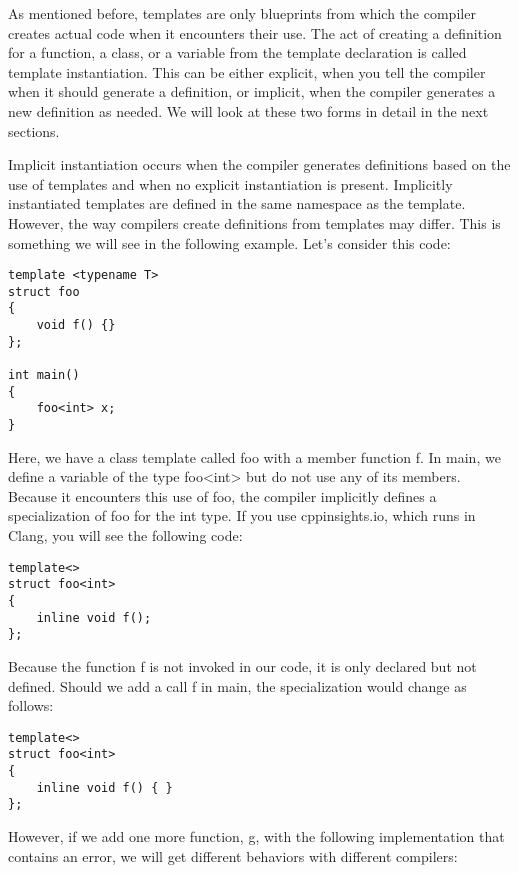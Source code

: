 
As mentioned before, templates are only blueprints from which the compiler creates actual code when it encounters their use. The act of creating a definition for a function, a class, or a variable from the template declaration is called template instantiation. This can be either explicit, when you tell the compiler when it should generate a definition, or implicit, when the compiler generates a new definition as needed. We will look at these two forms in detail in the next sections.


Implicit instantiation occurs when the compiler generates definitions based on the use of templates and when no explicit instantiation is present. Implicitly instantiated templates are defined in the same namespace as the template. However, the way compilers create definitions from templates may differ. This is something we will see in the following example. Let's consider this code:

\begin{lstlisting}[style=styleCXX]
template <typename T>
struct foo
{
	void f() {}
};

int main()
{
	foo<int> x;
}
\end{lstlisting}

Here, we have a class template called foo with a member function f. In main, we define a variable of the type foo<int> but do not use any of its members. Because it encounters this use of foo, the compiler implicitly defines a specialization of foo for the int type. If you use cppinsights.io, which runs in Clang, you will see the following code:

\begin{lstlisting}[style=styleCXX]
template<>
struct foo<int>
{
	inline void f();
};
\end{lstlisting}

Because the function f is not invoked in our code, it is only declared but not defined. Should we add a call f in main, the specialization would change as follows:

\begin{lstlisting}[style=styleCXX]
template<>
struct foo<int>
{
	inline void f() { }
};
\end{lstlisting}

However, if we add one more function, g, with the following implementation that contains an error, we will get different behaviors with different compilers:

